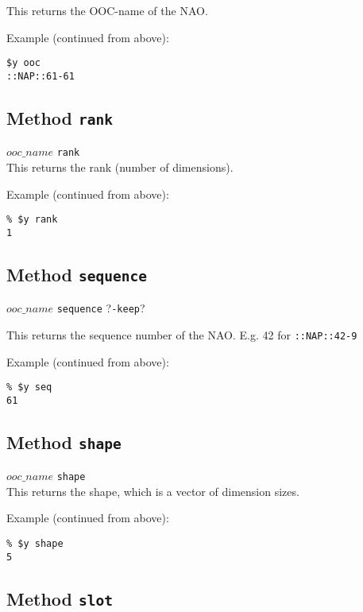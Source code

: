 This returns the OOC-name of the NAO.

Example (continued from above):
  \begin{verbatim}
$y ooc
::NAP::61-61
\end{verbatim}

\subsection{Method \texttt{rank}}
    \label{ooc-meta-rank}

  $ooc\_name$ 
  \texttt{rank}
  \\
  

This returns the rank (number of dimensions).
  
Example (continued from above):
  \begin{verbatim}
% $y rank
1
\end{verbatim}

\subsection{Method \texttt{sequence}}
    \label{ooc-meta-sequence}

$ooc\_name$ \texttt{sequence} ?\texttt{-keep}?

This returns the sequence number of the NAO. E.g. 42 for 
  \texttt{::NAP::42-9}

Example (continued from above):
  \begin{verbatim}
% $y seq
61
\end{verbatim}

\subsection{Method \texttt{shape}}
    \label{ooc-meta-shape}

  


  $ooc\_name$ 
  \texttt{shape}
  \\
  

This returns the shape, which is a vector of dimension sizes.
  
Example (continued from above):
  \begin{verbatim}
% $y shape
5
\end{verbatim}

\subsection{Method \texttt{slot}}
    \label{ooc-meta-slot}


